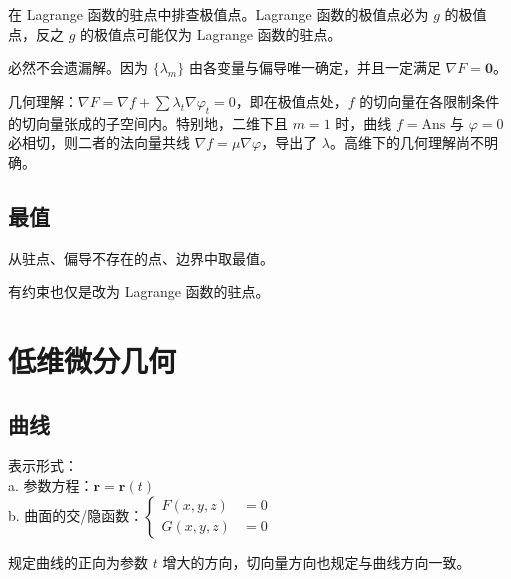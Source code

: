 \documentclass[12pt, a4paper, UTF8, openany]{ctexbook}
\newcommand{\mat}[1]{\mathbf{#1}}
\begin{document}
        在 Lagrange 函数的{\heiti 驻点}中排查极值点。Lagrange 函数的极值点必为 $g$ 的极值点，反之 $g$ 的极值点可能仅为 Lagrange 函数的驻点。

        必然不会遗漏解。因为 $\{\lambda_m\}$ 由各变量与偏导唯一确定，并且一定满足 $\nabla F = \mat{0}$。

        几何理解：$\nabla F = \nabla f + \sum \lambda_t \nabla \varphi_t = 0$，即在极值点处，$f$ 的切向量在各限制条件的切向量张成的子空间内。特别地，二维下且 $m = 1$ 时，曲线 $f = \text{Ans}$ 与 $\varphi = 0$ 必相切，则二者的法向量共线 $\nabla f = \mu \nabla \varphi$，导出了 $\lambda$。高维下的几何理解尚不明确。

        \subsection{最值}
        从驻点、偏导不存在的点、边界中取最值。

        有约束也仅是改为 Lagrange 函数的驻点。

    \section{低维微分几何}
        \subsection{曲线}
        表示形式：\\
        a. 参数方程：$\mat{r} = \mat{r}(t)$ \\
        b. 曲面的交/隐函数：$\begin{cases}
            F(x, y, z) &= 0 \\
            G(x, y, z) &= 0
        \end{cases}$

        规定曲线的正向为参数 $t$ 增大的方向，切向量方向也规定与曲线方向一致。
\end{document}
